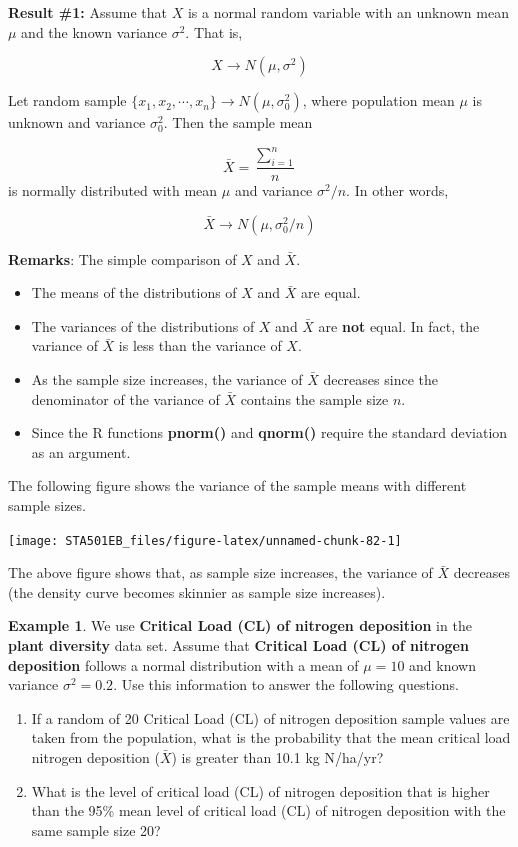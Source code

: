 \documentclass[
]{book}
\begin{document}
\textbf{Result \#1:} Assume that \(X\) is a normal random variable with an unknown mean \(\mu\) and the known variance \(\sigma^2\). That is,

\[
X \to N(\mu, \sigma^2)
\]

Let random sample \(\{x_1, x_2, \cdots, x_n \} \to N(\mu, \sigma_0^2)\), where population mean \(\mu\) is unknown and variance \(\sigma_0^2\). Then the sample mean

\[
\bar{X} = \frac{\sum_{i=1}^n}{n}
\]
is normally distributed with mean \(\mu\) and variance \(\sigma^2/n\). In other words,

\[
\bar{X} \to N(\mu, \sigma_0^2/n)
\]

\textbf{Remarks}: The simple comparison of \(X\) and \(\bar{X}\).

\begin{itemize}
\item
  The means of the distributions of \(X\) and \(\bar{X}\) are equal.
\item
  The variances of the distributions of \(X\) and \(\bar{X}\) are \textbf{not} equal. In fact, the variance of \(\bar{X}\) is less than the variance of \(X\).
\item
  As the sample size increases, the variance of \(\bar{X}\) decreases since the denominator of the variance of \(\bar{X}\) contains the sample size \(n\).
\item
  Since the R functions \textbf{pnorm()} and \textbf{qnorm()} require the standard deviation as an argument.
\end{itemize}

The following figure shows the variance of the sample means with different sample sizes.

\begin{center}\texttt{[image: STA501EB\_files/figure-latex/unnamed-chunk-82-1]} \end{center}

The above figure shows that, as sample size increases, the variance of \(\bar{X}\) decreases (the density curve becomes skinnier as sample size increases).

\textbf{Example 1}. We use \textbf{Critical Load (CL) of nitrogen deposition} in the \textbf{plant diversity} data set. Assume that \textbf{Critical Load (CL) of nitrogen deposition} follows a normal distribution with a mean of \(\mu=10\) and known variance \(\sigma^2 = 0.2\). Use this information to answer the following questions.

\begin{enumerate}
\def\labelenumi{\arabic{enumi}.}
\item
  If a random of 20 Critical Load (CL) of nitrogen deposition sample values are taken from the population, what is the probability that the mean critical load nitrogen deposition (\(\bar{X}\)) is greater than 10.1 kg N/ha/yr?
\item
  What is the level of critical load (CL) of nitrogen deposition that is higher than the 95\% mean level of critical load (CL) of nitrogen deposition with the same sample size 20?
\end{enumerate}
\end{document}
